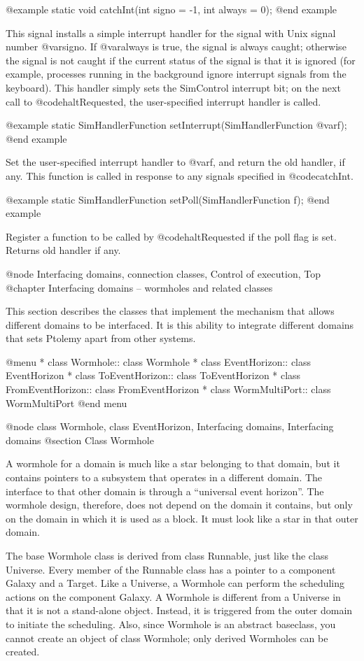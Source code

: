 @example
static void catchInt(int signo = -1, int always = 0);
@end example

This signal installs a simple interrupt handler for the signal with
Unix signal number @var{signo}.  If @var{always} is true, the
signal is always caught; otherwise the signal is not caught
if the current status of the signal is that it is ignored
(for example, processes running in the background ignore
interrupt signals from the keyboard).  This handler simply sets
the SimControl interrupt bit; on the next call to @code{haltRequested},
the user-specified interrupt handler is called.

@example
static SimHandlerFunction setInterrupt(SimHandlerFunction @var{f});
@end example

Set the user-specified interrupt handler to @var{f}, and return
the old handler, if any.  This function is called in response to
any signals specified in @code{catchInt}.

@example
static SimHandlerFunction setPoll(SimHandlerFunction f);
@end example

Register a function to be called by @code{haltRequested} if the poll
flag is set.  Returns old handler if any.

@node Interfacing domains, connection classes, Control of execution, Top
@chapter Interfacing domains -- wormholes and related classes

This section describes the classes that implement the mechanism that
allows different domains to be interfaced.  It is this ability to
integrate different domains that sets Ptolemy apart from other systems.

@menu
* class Wormhole::              class Wormhole
* class EventHorizon::          class EventHorizon
* class ToEventHorizon::        class ToEventHorizon
* class FromEventHorizon::      class FromEventHorizon
* class WormMultiPort::         class WormMultiPort
@end menu

@node class Wormhole, class EventHorizon, Interfacing domains, Interfacing domains
@section Class Wormhole

A wormhole for a domain is much like a star belonging to that domain,
but it contains pointers to a subsystem that operates in a different
domain.  The interface to that other domain is through a ``universal
event horizon''.  The wormhole design, therefore, does not depend on the
domain it contains, but only on the domain in which it is used as a
block.  It must look like a star in that outer domain.

The base Wormhole class is derived from class Runnable, just like the
class Universe.  Every member of the Runnable class has a pointer to a
component Galaxy and a Target.  Like a Universe, a Wormhole can perform
the scheduling actions on the component Galaxy. A Wormhole is different
from a Universe in that it is not a stand-alone object.  Instead, it is
triggered from the outer domain to initiate the scheduling.  Also, since
Wormhole is an abstract baseclass, you cannot create an object of class
Wormhole; only derived Wormholes can be created.

